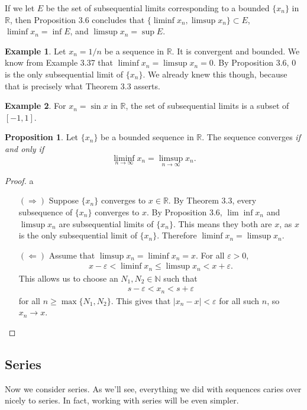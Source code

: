 \documentclass{article}
\newcommand{\N}{\mathbb{N}}
\newcommand{\R}{\mathbb{R}}
\theoremstyle{definition}
\newtheorem{proposition}{Proposition}[section]
\newtheorem{example}{Example}[section]
\begin{document}
	If we let $ E $ be the set of subsequential limits corresponding to a bounded $ \{x_n\} $ in $ \R $, then Proposition 3.6 concludes that $ \{\liminf x_n,\limsup x_n\}\subset E $, $ \liminf x_n=\inf E $, and $ \limsup x_n=\sup E $. 
	\begin{example}
		Let $ x_n=1/n $ be a sequence in $ \R $. It is convergent and bounded. We know from Example 3.37 that $ \liminf x_n=\limsup x_n=0 $. By Proposition 3.6, $ 0 $ is the only subsequential limit of $ \{x_n\} $. We already knew this though, because that is precisely what Theorem 3.3 asserts.
	\end{example}
	\begin{example}
		For $ x_n=\sin x $ in $ \R $, the set of subsequential limits is a subset of $ [-1,1] $. 
	\end{example}
	\begin{proposition}
		Let $ \{x_n\} $ be a bounded sequence in $ \R $. The sequence converges \textit{if and only if} $$ \liminf\limits_{n\to\infty} x_n=\limsup\limits_{n\to\infty} x_n.$$
	\end{proposition}
	\begin{proof}{\color{white}a}
		\begin{enumerate}
			\item [$ (\Longrightarrow) $] Suppose $ \{x_n\} $ converges to $ x\in \R $. By Theorem 3.3, every subsequence of $ \{x_n\} $ converges to $ x $. By Proposition 3.6, $ \lim\inf x_n $ and $ \limsup x_n $ are subsequential limits of $ \{x_n\} $. This means they both are $ x $, as $ x $ is the only subsequential limit of $ \{x_n\} $. Therefore $ \liminf x_n=\limsup x_n $.  
			\item [$ (\Longleftarrow) $] Assume that $ \limsup x_n=\liminf x_n=x $. For all $ \varepsilon>0 $, 
			\begin{align*}
				x-\varepsilon < \liminf x_n \le \limsup x_n< x+\varepsilon.
			\end{align*}
			This allows us to choose an $ N_1,N_2\in\N $ such that
			\begin{align*}
				s-\varepsilon<x_n<s+\varepsilon
			\end{align*}
			for all $ n\ge\max\{N_1,N_2\} $. This gives that $ |x_n-x|<\varepsilon $ for all such $ n $, so $ x_n\to x $. 
		\end{enumerate}
	\end{proof}
	\subsection{Series}
	Now we consider series. As we'll see, everything we did with sequences caries over nicely to series. In fact, working with series will be even simpler.
	
\end{document}
